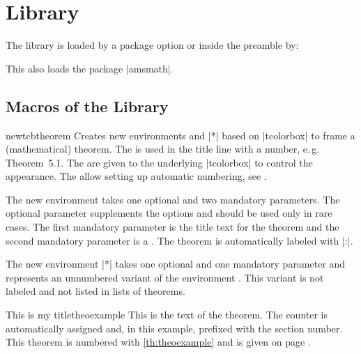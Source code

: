 \clearpage
\section{Library }\label{sec:theorems}
The library is loaded by a package option or inside the preamble by:
\begin{dispListing}
\end{dispListing}
This also loads the package |amsmath|.

\subsection{Macros of the Library}

\begin{docCommand}{newtcbtheorem}{}
  Creates new environments  and |*| based on |tcolorbox| to frame a
  (mathematical) theorem. The  is used in the title line
  with a number, e.\,g. \mbox{\flqq Theorem 5.1\frqq}.
  The  are given to the underlying |tcolorbox| to control
  the appearance.
  The  allow setting up automatic numbering,
  see .\par
  The new environment  takes one optional and two mandatory
  parameters. The optional parameter supplements the options and should be
  used only in rare cases.
  The first mandatory parameter is the title text for the theorem and
  the second mandatory parameter is a . The theorem is
  automatically labeled with |:|.\par
  The new environment |*| takes one optional and one mandatory
  parameter and represents an unnumbered variant of the environment .
  This variant is not labeled and not listed in lists of theorems.
\begin{dispExample}
\begin{mytheo}{This is my title}{theoexample}
  This is the text of the theorem. The counter is automatically assigned and,
  in this example, prefixed with the section number. This theorem is numbered with
  \ref{th:theoexample} and is given on page \pageref{th:theoexample}.
\end{mytheo}
\end{dispExample}


\end{docCommand}
